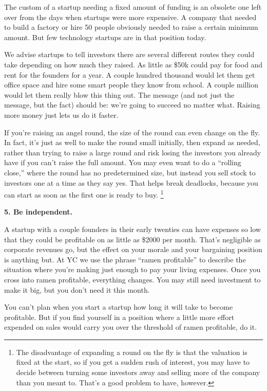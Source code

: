 \documentclass[12pt]{book}
\begin{document}
The custom of a startup needing a fixed amount of funding is an obsolete
one left over from the days when startups were more expensive. A company
that needed to build a factory or hire 50 people obviously needed to
raise a certain minimum amount. But few technology startups are in that
position today.

We advise startups to tell investors there are several different routes
they could take depending on how much they raised. As little as \$50k
could pay for food and rent for the founders for a year. A couple
hundred thousand would let them get office space and hire some smart
people they know from school. A couple million would let them really
blow this thing out. The message (and not just the message, but the
fact) should be: we're going to succeed no matter what. Raising more
money just lets us do it faster.

If you're raising an angel round, the size of the round can even change
on the fly. In fact, it's just as well to make the round small
initially, then expand as needed, rather than trying to raise a large
round and risk losing the investors you already have if you can't raise
the full amount. You may even want to do a ``rolling close,'' where the
round has no predetermined size, but instead you sell stock to investors
one at a time as they say yes. That helps break deadlocks, because you
can start as soon as the first one is ready to buy.
\footnote{The disadvantage of expanding a round on the fly is that the
valuation is fixed at the start, so if you get a sudden rush of
interest, you may have to decide between turning some investors away and
selling more of the company than you meant to. That's a good problem to
have, however.}

\textbf{5. Be independent.}

A startup with a couple founders in their early twenties can have
expenses so low that they could be profitable on as little as \$2000 per
month. That's negligible as corporate revenues go, but the effect on
your morale and your bargaining position is anything but. At YC we use
the phrase ``ramen profitable'' to describe the situation where you're
making just enough to pay your living expenses. Once you cross into
ramen profitable, everything changes. You may still need investment to
make it big, but you don't need it this month.

You can't plan when you start a startup how long it will take to become
profitable. But if you find yourself in a position where a little more
effort expended on sales would carry you over the threshold of ramen
profitable, do it.
\end{document}
